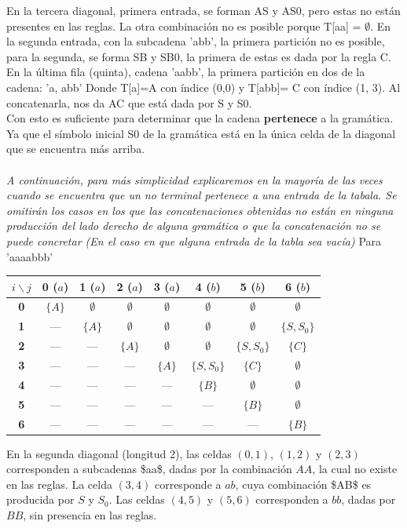 \documentclass[12pt, letterpaper]{article}
\begin{document}
\begin{enumerate}
\begin{enumerate}[label=(\alph*)]
  En la tercera diagonal, primera entrada, se forman AS y AS0, pero estas no están presentes en las reglas. La otra combinación no es posible porque T[aa] = $\emptyset$.
  En la segunda entrada, con la subcadena 'abb', la primera partición no es posible, para la segunda, se forma SB y SB0, la primera de estas es dada por la regla C.\\

  En la última fila (quinta), cadena 'aabb', la primera partición en dos de la cadena: 'a, abb' Donde T[a]={A} con índice (0,0) y T[abb]= C con índice (1, 3). Al concatenarla, nos da AC que está dada por S y S0.\\

  Con esto es suficiente para determinar que la cadena \textbf{pertenece} a la gramática. Ya que el símbolo inicial S0 de la gramática está en la única celda de la diagonal que se encuentra más arriba.\\\\

  \textit{A continuación, para más simplicidad explicaremos en la mayoría de las veces cuando se encuentra que un no terminal pertenece a una entrada de la tabala. Se omitirán los casos en los que las concatenaciones obtenidas no están en ninguna producción del lado derecho de alguna gramática o que la concatenación no se puede concretar (En el caso en que alguna entrada de la tabla sea vacía)}
  \newpage
  Para 'aaaabbb'
  \begin{table}[h!]
    \centering
    \begin{tabular}{cccccccc}
      \toprule
      $i \backslash j$ & \textbf{0 ($a$)} & \textbf{1 ($a$)} & \textbf{2 ($a$)} & \textbf{3 ($a$)} & \textbf{4 ($b$)} & \textbf{5 ($b$)} & \textbf{6 ($b$)} \\
      \midrule
      \textbf{0} & $\{A\}$ & $\emptyset$ & $\emptyset$ & $\emptyset$ & $\emptyset$ & $\emptyset$ & $\emptyset$ \\
      \textbf{1} & — & $\{A\}$ & $\emptyset$ & $\emptyset$ & $\emptyset$ & $\emptyset$& $\{S, S_0\}$\\
      \textbf{2} & — & — & $\{A\}$ & $\emptyset$ & $\emptyset$& $\{S, S_0\}$& $\{C\}$\\
      \textbf{3} & — & — & — & $\{A\}$ & $\{S, S_0\}$& $\{C\}$ & $\emptyset$ \\
      \textbf{4} & — & — & — & — & $\{B\}$ & $\emptyset$ & $\emptyset$ \\
      \textbf{5} & — & — & — & — & — & $\{B\}$ & $\emptyset$ \\
      \textbf{6} & — & — & — & — & — & — & $\{B\}$ \\
      \bottomrule
    \end{tabular}
  \end{table}
  En la segunda diagonal (longitud 2), las celdas $(0,1)$, $(1,2)$ y $(2,3)$ corresponden a subcadenas \$aa\$, dadas por la combinación $AA$, la cual no existe en las reglas. La celda $(3,4)$ corresponde a $ab$, cuya combinación \$AB\$ es producida por $S$ y $S_0$. Las celdas $(4,5)$ y $(5,6)$ corresponden a $bb$, dadas por $BB$, sin presencia en las reglas.\\


\end{enumerate}
\end{enumerate}
\end{document}
